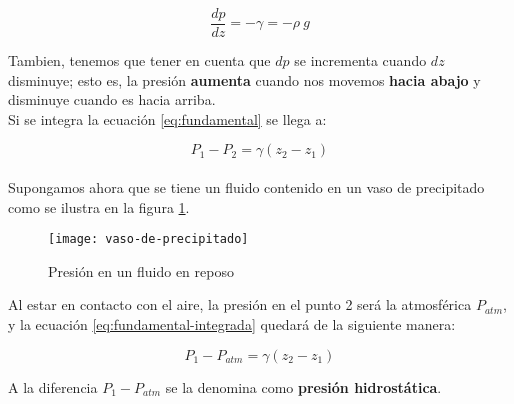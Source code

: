 \begin{equation}
	\dfrac{dp}{dz}= - \gamma = - \rho\ g
	\label{eq:fundamental}
\end{equation}

Tambien, tenemos que tener en cuenta que $dp$ se incrementa cuando $dz$ disminuye; esto es, la presión \textbf{aumenta} cuando nos movemos \textbf{hacia abajo} y disminuye cuando es hacia arriba.\\

Si se integra la ecuación \ref{eq:fundamental} se llega a:

\begin{equation}
	P_1 - P_2 = \gamma (z_2 - z_1)
	\label{eq:fundamental-integrada}
\end{equation}\\


Supongamos ahora que se tiene un fluido contenido en un vaso de precipitado como se ilustra en la figura \ref{fig:precipitado}. 

\begin{figure}[H]
	\centering
	\texttt{[image: vaso-de-precipitado]}\label{fig:precipitado}
	\caption{Presión en un fluido en reposo}
\end{figure}

Al estar en contacto con el aire, la presión en el punto 2 será la atmosférica $P_{atm}$, y la ecuación \ref{eq:fundamental-integrada} quedará de la siguiente manera:




\begin{equation}
	P_1 - P_{atm} = \gamma (z_2 - z_1)
\end{equation}


A la diferencia $P_1 - P_{atm}$ se la denomina como \textbf{presión hidrostática}.\\



